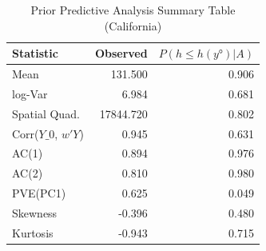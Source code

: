 \begin{table}[!h]
\centering
\caption{\label{tab:tab:ca_ppa}Prior Predictive Analysis Summary Table (California)}
\centering
\begin{tabular}[t]{lrr}
\toprule
Statistic & Observed & $P(h ≤ h(y°) | A)$\\
\midrule
Mean & 131.500 & 0.906\\
log-Var & 6.984 & 0.681\\
Spatial Quad. & 17844.720 & 0.802\\
Corr($Y\_0$, $w'Y$) & 0.945 & 0.631\\
AC(1) & 0.894 & 0.976\\
\addlinespace
AC(2) & 0.810 & 0.980\\
PVE(PC1) & 0.625 & 0.049\\
Skewness & -0.396 & 0.480\\
Kurtosis & -0.943 & 0.715\\
\bottomrule
\end{tabular}
\end{table}
